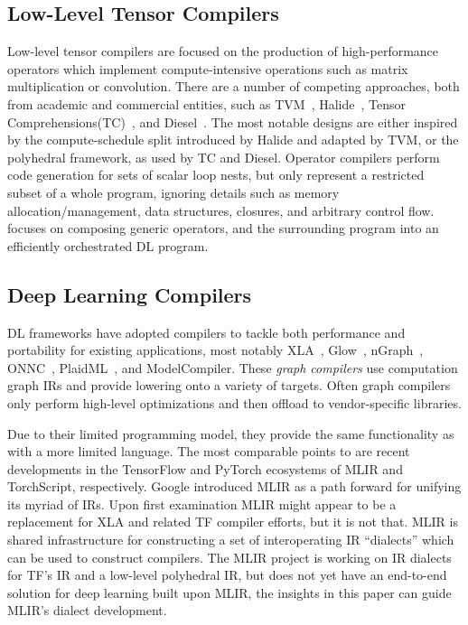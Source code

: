 \subsection{Low-Level Tensor Compilers}
Low-level tensor compilers are focused on the production
    of high-performance operators which implement compute-intensive
    operations such as matrix multiplication or convolution.
There are a number of competing approaches,
    both from academic and commercial entities, such as
    TVM~\citep{tvm_osdi18}, Halide~\citep{halide}, Tensor Comprehensions(TC)~\citep{tensor_comprehensions},
    and Diesel~\citep{diesel}.
The most notable designs are either inspired by the
    compute-schedule split introduced by Halide
    and adapted by TVM, or the polyhedral framework,
    as used by TC and Diesel.
Operator compilers perform code generation for sets of scalar loop nests,
    but only represent a restricted subset of a whole program, ignoring details such as
    memory allocation/management, data structures, closures, and arbitrary control flow.
\relay focuses on composing generic operators, and the surrounding program
    into an efficiently orchestrated DL program.

\subsection{Deep Learning Compilers}

DL frameworks have adopted compilers
    to tackle both performance and portability
    for existing applications, most notably
    XLA~\citep{xla}, Glow~\citep{glow}, nGraph~\citep{ngraph}, ONNC~\citep{onnc},
    PlaidML~\citep{plaidml}, and ModelCompiler.
These \textit{graph compilers} use computation graph IRs and provide
    lowering onto a variety of targets.
Often graph compilers only perform high-level optimizations
    and then offload to vendor-specific libraries.

Due to their limited programming model, they
    provide the same functionality as \relay with
    a more limited language.
The most comparable points to \relay are recent
    developments in the TensorFlow and PyTorch
    ecosystems of MLIR and TorchScript, respectively.
Google introduced MLIR as a path forward for
    unifying its myriad of IRs.
Upon first examination MLIR might appear to be
    a replacement for XLA and related TF compiler
    efforts, but it is not that.
MLIR is shared infrastructure for constructing
    a set of interoperating IR ``dialects'' which
    can be used to construct compilers.
The MLIR project is working on IR dialects
    for TF's IR and a low-level polyhedral IR,
    but does not yet have an end-to-end solution for
    deep learning built upon MLIR, the insights in
    this paper can guide MLIR's dialect development.

